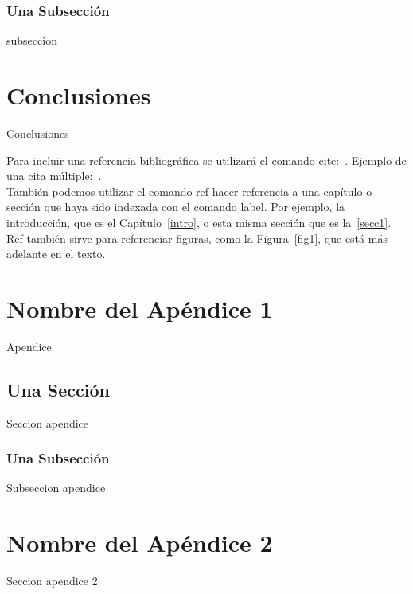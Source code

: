 \documentclass[12pt,a4paper,oneside]{book}
\begin{document}
\subsection{Una Subsección}

subseccion

\chapter{Conclusiones}
\label{conclusiones}

Conclusiones

Para incluir una referencia bibliográfica se utilizará el comando cite:~\cite{girard1989}.
Ejemplo de una cita múltiple:~\cite{ranta2012,tcs2015}.\\

También podemos utilizar el comando ref hacer referencia a una capítulo o sección que haya sido indexada con el comando label. Por ejemplo, la introducción, que es el Capítulo~\ref{intro}, o esta misma sección que es la~\ref{secc1}. Ref también sirve para referenciar figuras, como la Figura~\ref{fig1}, que está más adelante en el texto.





\label{bibliografia}

\appendix %


\chapter{Nombre del Apéndice 1} 
\label{apendice1}
Apendice

\section{Una Sección}

Seccion apendice

\subsection{Una Subsección}

Subseccion apendice

\chapter{Nombre del Apéndice 2} 

Seccion apendice 2

\end{document}
